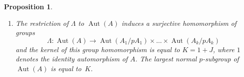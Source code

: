 \documentclass{article}
\newtheorem{proposition}[theorem]{Proposition}
\DeclareMathOperator{\Aut}{Aut}
\DeclareMathOperator{\Hom}{Hom}
\DeclareMathOperator{\End}{End}
\begin{document}
\begin{proposition}
\begin{enumerate}
			This map is a surjective ring homomorphism, and its kernel \( J \) is equal to the set of matrices of the following form
			\[ \begin{pmatrix}
				p \cdot u_{11} & u_{12} & \dots & u_{1k}\\
				\vdots & \vdots & \dots & \vdots\\
				u_{k1} & u_{k2} & \dots & p \cdot u_{kk}
			   \end{pmatrix}
			\]
			where \( u_{ij} \in \Hom(A_i, A_j) \). The Jacobson radical of \( \End(A) \) is equal to \( J \).
		\item The restriction of \( \Lambda \) to \( \Aut(A) \) induces a surjective homomorphism of groups
			\[ \Lambda : \Aut(A) \to \Aut(A_1 / pA_1) \times \dots \times \Aut(A_k / pA_k) \]
			and the kernel of this group homomorphism is equal to \( K = 1 + J \), where \( 1 \) denotes the identity automorphism of \( A \).
			The largest normal \( p \)-subgroup of \( \Aut(A) \) is equal to~\( K \).
	\end{enumerate}
\end{proposition}
\end{document}
